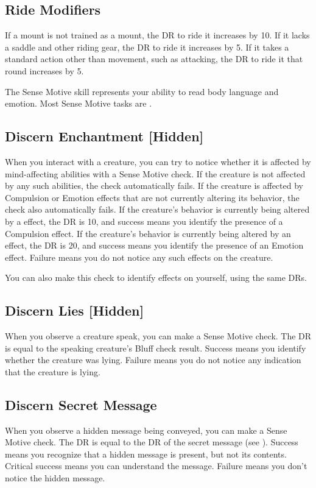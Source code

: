     \subsection{Ride Modifiers}\label{Ride Modifiers}
        If a mount is not trained as a mount, the DR to ride it increases by 10.
        If it lacks a saddle and other riding gear, the DR to ride it increases by 5. If it takes a standard action other than movement, such as attacking, the DR to ride it that round increases by 5.

\newpage
{}
        The Sense Motive skill represents your ability to read body language and emotion.
        Most Sense Motive tasks are .

    \subsection{Discern Enchantment [Hidden]}
        When you interact with a creature, you can try to notice whether it is affected by mind-affecting abilities with a Sense Motive check.
        If the creature is not affected by any such abilities, the check automatically fails.
        If the creature is affected by Compulsion or Emotion effects that are not currently altering its behavior, the check also automatically fails.
        If the creature's behavior is currently being altered by a  effect, the DR is 10, and success means you identify the presence of a Compulsion effect.
        If the creature's behavior is currently being altered by an  effect, the DR is 20, and success means you identify the presence of an Emotion effect.
        Failure means you do not notice any such effects on the creature.

        You can also make this check to identify  effects on yourself, using the same DRs.

    \subsection{Discern Lies [Hidden]}
        When you observe a creature speak, you can make a Sense Motive check.
        The DR is equal to the speaking creature's Bluff check result.
        Success means you identify whether the creature was lying.
        Failure means you do not notice any indication that the creature is lying.

    \subsection{Discern Secret Message}
        When you observe a hidden message being conveyed, you can make a Sense Motive check.
        The DR is equal to the DR of the secret message (see ).
        Success means you recognize that a hidden message is present, but not its contents.
        Critical success means you can understand the message.
        Failure means you don't notice the hidden message.

